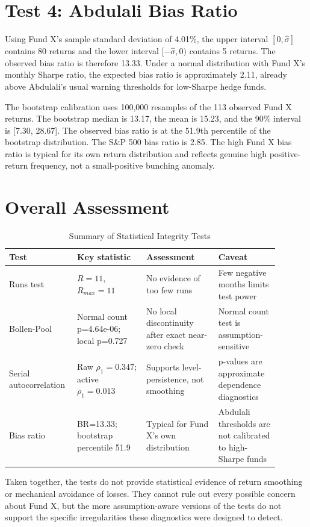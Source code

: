 \documentclass[11pt]{article}
\begin{document}
\section*{Test 4: Abdulali Bias Ratio}
Using Fund X's sample standard deviation of 4.01\%, the upper interval $[0,\hat\sigma]$ contains 80 returns and the lower interval $[-\hat\sigma,0)$ contains 5 returns.
The observed bias ratio is therefore 13.33.
Under a normal distribution with Fund X's monthly Sharpe ratio, the expected bias ratio is approximately 2.11, already above Abdulali's usual warning thresholds for low-Sharpe hedge funds.

The bootstrap calibration uses 100,000 resamples of the 113 observed Fund X returns.
The bootstrap median is 13.17, the mean is 15.23, and the 90\% interval is [7.30, 28.67].
The observed bias ratio is at the 51.9th percentile of the bootstrap distribution.
The S\&P 500 bias ratio is 2.85.
The high Fund X bias ratio is typical for its own return distribution and reflects genuine high positive-return frequency, not a small-positive bunching anomaly.

\clearpage
\section*{Overall Assessment}
\begin{table}[H]
\centering
\caption{Summary of Statistical Integrity Tests}
\begin{tabular}{L{0.19\linewidth}L{0.24\linewidth}L{0.25\linewidth}L{0.21\linewidth}}
\toprule
Test & Key statistic & Assessment & Caveat \\
\midrule
Runs test & $R=11$, $R_{max}=11$ & No evidence of too few runs & Few negative months limits test power \\
Bollen-Pool & Normal count p=4.64e-06; local p=0.727 & No local discontinuity after exact near-zero check & Normal count test is assumption-sensitive \\
Serial autocorrelation & Raw $\rho_1=0.347$; active $\rho_1=0.013$ & Supports level-persistence, not smoothing & p-values are approximate dependence diagnostics \\
Bias ratio & BR=13.33; bootstrap percentile 51.9 & Typical for Fund X's own distribution & Abdulali thresholds are not calibrated to high-Sharpe funds \\
\bottomrule
\end{tabular}
\end{table}

Taken together, the tests do not provide statistical evidence of return smoothing or mechanical avoidance of losses.
They cannot rule out every possible concern about Fund X, but the more assumption-aware versions of the tests do not support the specific irregularities these diagnostics were designed to detect.
\end{document}
